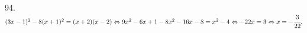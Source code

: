 94. $(3x-1)^2-8(x+1)^2=(x+2)(x-2)\Leftrightarrow 9x^2-6x+1-8x^2-16x-8=x^2-4\Leftrightarrow-22x=3\Leftrightarrow x=-\cfrac{3}{22}.$\\
